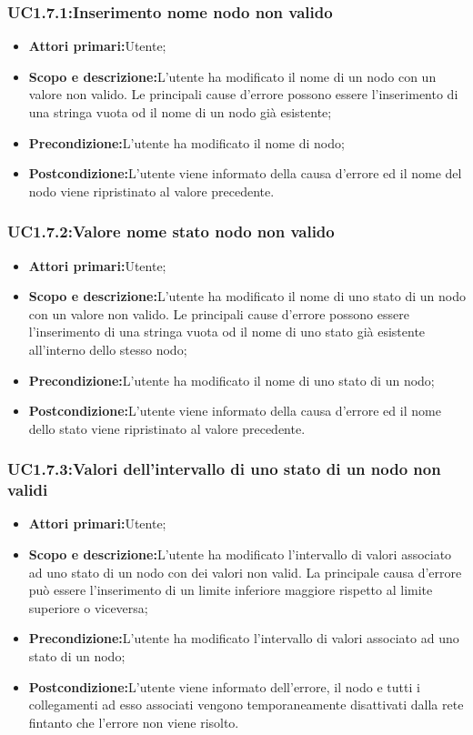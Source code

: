 \subsubsection{UC1.7.1:Inserimento nome nodo non valido}
\begin{itemize}
	\item{\textbf{Attori primari:}Utente;}
	\item{\textbf{Scopo e descrizione:}L'utente ha modificato il nome di un nodo con un valore non valido. Le principali cause d'errore possono essere l'inserimento di una stringa vuota od il nome di un nodo già esistente;}
	\item{\textbf{Precondizione:}L'utente ha modificato il nome di nodo;}
	\item{\textbf{Postcondizione:}L'utente viene informato della causa d'errore ed il nome del nodo viene ripristinato al valore precedente.}
\end{itemize}
\subsubsection{UC1.7.2:Valore nome stato nodo non valido}
\begin{itemize}
	\item{\textbf{Attori primari:}Utente;}
	\item{\textbf{Scopo e descrizione:}L'utente ha modificato il nome di uno stato di un nodo con un valore non valido. Le principali cause d'errore possono essere l'inserimento di una stringa vuota od il nome di uno stato già esistente all'interno dello stesso nodo;}
	\item{\textbf{Precondizione:}L'utente ha modificato il nome di uno stato di un nodo;}
	\item{\textbf{Postcondizione:}L'utente viene informato della causa d'errore ed il nome dello stato viene ripristinato al valore precedente.}
\end{itemize}
\subsubsection{UC1.7.3:Valori dell'intervallo di uno stato di un nodo non validi}
\begin{itemize}
	\item{\textbf{Attori primari:}Utente;}
	\item{\textbf{Scopo e descrizione:}L'utente ha modificato l'intervallo di valori associato ad uno stato di un nodo con dei valori non valid. La principale causa d'errore può essere l'inserimento di un limite inferiore maggiore rispetto al limite superiore o viceversa;}
	\item{\textbf{Precondizione:}L'utente ha modificato l'intervallo di valori associato ad uno stato di un nodo;}
	\item{\textbf{Postcondizione:}L'utente viene informato dell'errore, il nodo e tutti i collegamenti ad esso associati vengono temporaneamente disattivati dalla rete fintanto che l'errore non viene risolto.}
\end{itemize}
